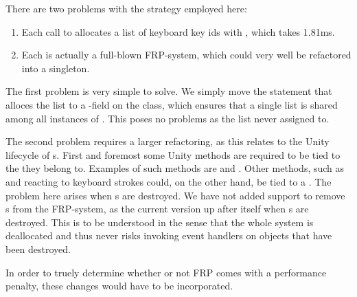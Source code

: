 There are two problems with the strategy employed here:
\begin{enumerate}
    \item Each call to  allocates a list of keyboard key ids with , which takes 1.81ms.
    \item Each  is actually a full-blown \gls{FRP}-system, which could very well be refactored into a singleton.
\end{enumerate}

The first problem is very simple to solve. We simply move the statement that alloces the list to a -field on the class, which ensures that a single list is shared among all instances of . This poses no problems as the list never assigned to.

The second problem requires a larger refactoring, as this relates to the Unity lifecycle of s. First and foremost some Unity methods are required to be tied to the  they belong to. Examples of such methods are  and . Other methods, such as  and reacting to keyboard strokes could, on the other hand, be tied to a . The problem here arises when s are destroyed. We have not added support to remove s from the \gls{FRP}-system, as the current version  up after itself when s are destroyed. This is to be understood in the sense that the whole system is deallocated and thus never risks invoking event handlers on objects that have been destroyed.

In order to truely determine whether or not \gls{FRP} comes with a performance penalty, these changes would have to be incorporated.
